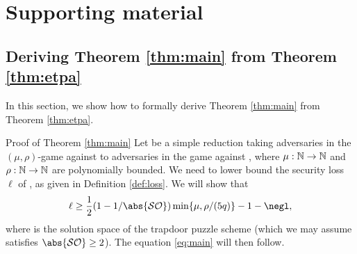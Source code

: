 
\section{Supporting material}

\subsection{Deriving Theorem \ref{thm:main} from Theorem \ref{thm:etpa}}

In this section, we show how to formally derive Theorem \ref{thm:main}
from Theorem \ref{thm:etpa}.

\begin{namedproof}{Proof of Theorem \ref{thm:main}}
  Let \redR be a simple reduction
  taking adversaries in the \((\mu,\rho)\)-\ETPA game against \TP to
  adversaries in the \SICA game against \Simple,
  where \(\mu : \mathbb{N} \to \mathbb{N}\) and \(\rho : \mathbb{N} \to \mathbb{N}\) are polynomially bounded.
  We need to lower bound the security loss \(\ell\) of \redR, as given in Definition \ref{def:loss}.
  We will show that
  \begin{equation}\label{eq:show}
    \ell \ge \frac{1}{2}(1 - 1 / \abs{\SO}) \min \left\{ \mu, \rho / (5q) \right\} - 1 - \negl,
  \end{equation}
  where \SO is the solution space of the trapdoor puzzle scheme \TP
  (which we may assume satisfies \(\abs{\SO} \ge 2\)).
  The equation \eqref{eq:main} will then follow.


\end{namedproof}
